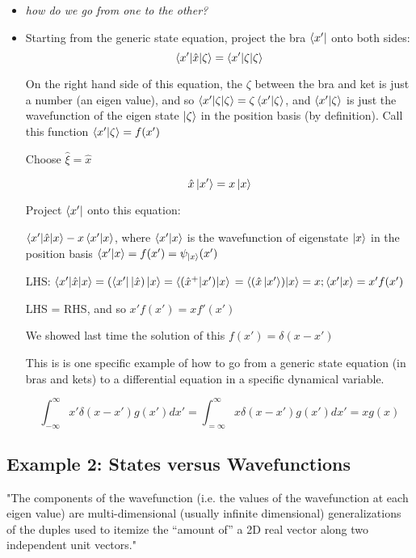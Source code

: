 \documentclass{article}
\begin{document}
\begin{itemize}
    \item \textit{how do we go from one to the other?}
    \item Starting from the generic state equation, project the bra $\bra{x'}$ onto both sides:
    $$\braket{x'|\hat{x}| \zeta} = \braket{x'|\zeta|\zeta}$$
    
    On the right hand side of this equation, the $\zeta$ between the bra and ket is just a number (an eigen value), and so $\braket{x'|\zeta|\zeta} = \zeta \braket{x'|\zeta}$, and $\braket{x'|\zeta}$ is just the wavefunction of the eigen state $\ket{\zeta}$ in the position basis (by definition). Call this function $\braket{x'|\zeta} = f(x')$
    
    Choose $\hat{\xi} = \hat x$
    
    $$\hat{x} \ket{x'} = x \ket{x}$$
    
    Project $\bra{x'}$ onto this equation:
    
    $\braket{x'|\hat{x}|x} - x \braket{x'|x}$, where $\braket{x'|x}$ is the wavefunction of eigenstate $\ket{x}$ in the position basis $\braket{x'|x} = f(x') = \psi_{\ket{x}}(x')$
    
    LHS:  $\braket{x'|\hat{x}|x} = \left( \bra{x'}|\hat{x} \right) \ket{x} = \braket{(\hat{x}^+ | x')|x}$
    $= \braket{(\hat{x} \ket{x'}) | x} = x; \braket{x'|x} = x' f(x')$
    
    LHS = RHS, and so $x' f(x') = x f'(x')$
    
    We showed last time the solution of this $f(x') = \delta(x -x')$
    
    This is is one specific example of how to go from a generic state equation (in bras and kets) to a differential equation in a specific dynamical variable.
    
    $$\int_{- \infty}^\infty x' \delta(x - x') g(x') dx' = \int_{= \infty}^\infty x \delta(x -x') g(x') dx' = x g(x)$$
    
    
\end{itemize}

\subsection{Example 2: States versus Wavefunctions}

"The components of the wavefunction (i.e. the values of the wavefunction at each eigen value) are multi-dimensional (usually infinite dimensional) generalizations of the duples used to itemize the “amount of” a 2D real vector along two independent unit vectors."
\end{document}
